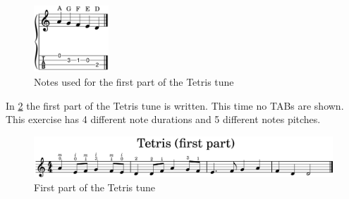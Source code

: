 \begin{figure}[h]
	\centering
	\includegraphics[width=0.25\textwidth]{../../MuseScore/Ukulele/UkuleleNotesUsedInTetrisFirstPart.png}
	\caption{Notes used for the first part of the Tetris tune}
	\label{fig:ukulele_notes_for_tetris_first_part}
\end{figure}

In \ref{fig:ukulele_tetris_simple_first_part} the first part of the Tetris tune is written. This time no TABs are shown. This exercise has 4 different note durations and 5 different notes pitches.

\begin{figure}[h]
	\centering
	\includegraphics[width=\textwidth]{../../MuseScore/Ukulele/UkuleleTetrisSimpleFirstPart.png}
	\caption{First part of the Tetris tune}
	\label{fig:ukulele_tetris_simple_first_part}
\end{figure}


